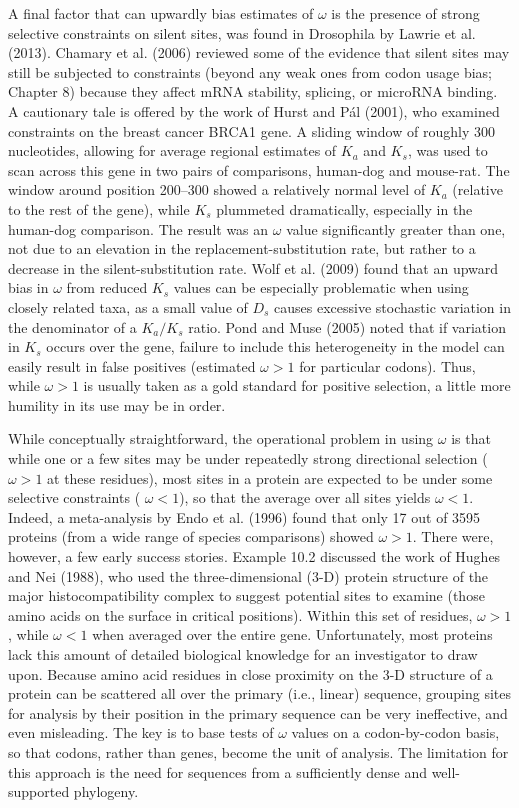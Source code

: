 \documentclass{article}
\begin{document}
A final factor that can upwardly bias estimates of  $ \omega $ is the presence of strong selective constraints on silent sites, was found in Drosophila by Lawrie et al. (2013). Chamary et al. (2006) reviewed some of the evidence that silent sites may still be subjected to constraints (beyond any weak ones from codon usage bias; Chapter 8) because they affect mRNA stability, splicing, or microRNA binding. A cautionary tale is offered by the work of Hurst and Pál (2001), who examined constraints on the breast cancer BRCA1 gene. A sliding window of roughly 300 nucleotides, allowing for average regional estimates of  $ K_a $ and  $ K_s $, was used to scan across this gene in two pairs of comparisons, human-dog and mouse-rat. The window around position 200–300 showed a relatively normal level of  $ K_a $ (relative to the rest of the gene), while  $ K_s $ plummeted dramatically, especially in the human-dog comparison. The result was an  $ \omega $ value significantly greater than one, not due to an elevation in the replacement-substitution rate, but rather to a decrease in the silent-substitution rate. Wolf et al. (2009) found that an upward bias in  $ \omega $ from reduced  $ K_s $ values can be especially problematic when using closely related taxa, as a small value of  $ D_s $ causes excessive stochastic variation in the denominator of a  $ K_a/K_s $ ratio. Pond and Muse (2005) noted that if variation in  $ K_s $ occurs over the gene, failure to include this heterogeneity in the model can easily result in false positives (estimated  $ \omega > 1 $ for particular codons). Thus, while  $ \omega > 1 $ is usually taken as a gold standard for positive selection, a little more humility in its use may be in order.

While conceptually straightforward, the operational problem in using  $ \omega $ is that while one or a few sites may be under repeatedly strong directional selection ( $ \omega > 1 $ at these residues), most sites in a protein are expected to be under some selective constraints ( $ \omega < 1 $), so that the average over all sites yields  $ \omega < 1 $. Indeed, a meta-analysis by Endo et al. (1996) found that only 17 out of 3595 proteins (from a wide range of species comparisons) showed  $ \omega > 1 $. There were, however, a few early success stories. Example 10.2 discussed the work of Hughes and Nei (1988), who used the three-dimensional (3-D) protein structure of the major histocompatibility complex to suggest potential sites to examine (those amino acids on the surface in critical positions). Within this set of residues,  $ \omega > 1 $, while  $ \omega < 1 $ when averaged over the entire gene. Unfortunately, most proteins lack this amount of detailed biological knowledge for an investigator to draw upon. Because amino acid residues in close proximity on the 3-D structure of a protein can be scattered all over the primary (i.e., linear) sequence, grouping sites for analysis by their position in the primary sequence can be very ineffective, and even misleading. The key is to base tests of  $ \omega $ values on a codon-by-codon basis, so that codons, rather than genes, become the unit of analysis. The limitation for this approach is the need for sequences from a sufficiently dense and well-supported phylogeny.
\end{document}
